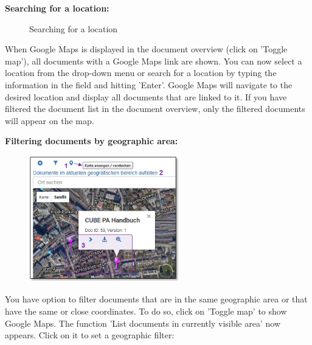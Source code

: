 \vspace{\baselineskip}

\textbf{Searching for a location:} 

\begin{figure}[H]
\caption{Searching for a location}
\end{figure}

When Google Maps is displayed in the document overview (click on 'Toggle map'), all documents with a Google Maps link are shown. You can now select a location from the drop-down menu  or search for a location  by typing the information in the field and hitting 'Enter'. Google Maps will navigate to the desired location and display all documents that are linked to it. If you have filtered the document list in the document overview, only the filtered documents will appear on the map. %

\pagebreak
\textbf{Filtering documents by geographic area:} \\

\begin{figure}
  \vspace{-35pt}
  \begin{center}
    \includegraphics[height=55mm]{../chapters/11_Dokumentenablage/pictures/11-2-3_GeoBereichFilter.jpg}
  \end{center}
  \vspace{-20pt}
  \vspace{-10pt}
\end{figure}
You have option to filter documents that are in the same geographic area or that have the same or close coordinates. To do so, click on 'Toggle map'  to show Google Maps. The function 'List documents in currently visible area'  now appears. Click on it to set a geographic filter:

